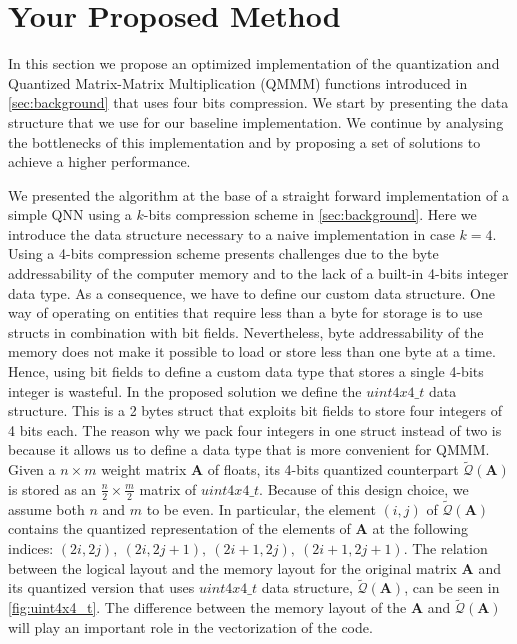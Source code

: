 \section{Your Proposed Method}\label{sec:yourmethod}
In this section we propose an optimized implementation of the quantization and Quantized Matrix-Matrix Multiplication (QMMM) functions introduced in \cref{sec:background} that uses four bits compression. We start by presenting the data structure that we use for our baseline implementation. We continue by analysing the bottlenecks of this implementation and by proposing a set of solutions to achieve a higher performance.

We presented the algorithm at the base of a straight forward implementation of a simple QNN using a $k$-bits compression scheme in \cref{sec:background}. Here we introduce the data structure necessary to a naive implementation in case $k=4$. Using a 4-bits compression scheme presents challenges due to the byte addressability of the computer memory and to the lack of a built-in 4-bits integer data type. As a consequence, we have to define our custom data structure. One way of operating on entities that require less than a byte for storage is to use structs in combination with bit fields. Nevertheless, byte addressability of the memory does not make it possible to load or store less than one byte at a time. Hence, using bit fields to define a custom data type that stores a single 4-bits integer is wasteful.  In the proposed solution we define the $uint4x4\_t$ data structure. This is a 2 bytes struct that exploits bit fields to store four integers of 4 bits each. The reason why we pack four integers in one struct instead of two is because it allows us to define a data type that is more convenient for QMMM. Given a $n\times m$ weight matrix $\mathbf{A}$ of floats, its 4-bits quantized counterpart $\tilde{\mathcal{Q}}(\mathbf{A})$ is stored as an $\frac{n}{2}\times \frac{m}{2}$ matrix of $uint4x4\_t$. Because of this design choice, we assume both $n$ and $m$ to be even. In particular, the element $(i, j)$ of $\tilde{\mathcal{Q}}(\mathbf{A})$ contains the quantized representation of the elements of $\mathbf{A}$ at the following indices: $(2i, 2j),~(2i, 2j+1),~(2i+1, 2j),~(2i+1, 2j+1)$. The relation between the logical layout and the memory layout for the original matrix $\mathbf{A}$ and its quantized version that uses $uint4x4\_t$ data structure,   $\tilde{\mathcal{Q}}(\mathbf{A})$, can be seen in \cref{fig:uint4x4_t}. The difference between the memory layout of the $\mathbf{A}$ and $\tilde{\mathcal{Q}}(\mathbf{A})$ will play an important role in the vectorization of the code.


